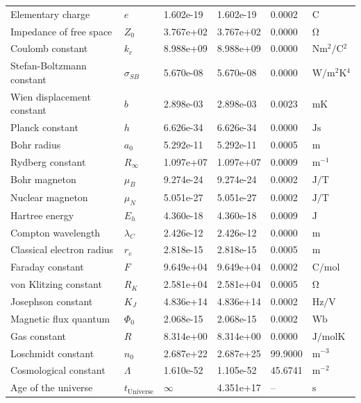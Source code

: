 \begin{longtable}{>{\raggedright}p{4.0cm}p{1.2cm}p{1.8cm}p{2.0cm}p{1.6cm}p{2.0cm}}
		Elementary charge & $e$ & 1.602e-19 & 1.602e-19 & 0.0002 & $\si{\coulomb}$ \\
		Impedance of free space & $Z_0$ & 3.767e+02 & 3.767e+02 & 0.0000 & $\si{\ohm}$ \\
		Coulomb constant & $k_e$ & 8.988e+09 & 8.988e+09 & 0.0000 & $\si{\newton \meter^2 \per \coulomb^2}$ \\
		Stefan-Boltzmann constant & $\sigma_{SB}$ & 5.670e-08 & 5.670e-08 & 0.0000 & $\si{\watt \per \meter^2 \kelvin^4}$ \\
		Wien displacement constant & $b$ & 2.898e-03 & 2.898e-03 & 0.0023 & $\si{\meter \kelvin}$ \\
		Planck constant & $h$ & 6.626e-34 & 6.626e-34 & 0.0000 & $\si{\joule \second}$ \\
		Bohr radius & $a_0$ & 5.292e-11 & 5.292e-11 & 0.0005 & $\si{\meter}$ \\
		Rydberg constant & $R_\infty$ & 1.097e+07 & 1.097e+07 & 0.0009 & $\si{\meter^{-1}}$ \\
		Bohr magneton & $\mu_B$ & 9.274e-24 & 9.274e-24 & 0.0002 & $\si{\joule \per \tesla}$ \\
		Nuclear magneton & $\mu_N$ & 5.051e-27 & 5.051e-27 & 0.0002 & $\si{\joule \per \tesla}$ \\
		Hartree energy & $E_h$ & 4.360e-18 & 4.360e-18 & 0.0009 & $\si{\joule}$ \\
		Compton wavelength & $\lambda_C$ & 2.426e-12 & 2.426e-12 & 0.0000 & $\si{\meter}$ \\
		Classical electron radius & $r_e$ & 2.818e-15 & 2.818e-15 & 0.0005 & $\si{\meter}$ \\
		Faraday constant & $F$ & 9.649e+04 & 9.649e+04 & 0.0002 & $\si{\coulomb \per \mole}$ \\
		von Klitzing constant & $R_K$ & 2.581e+04 & 2.581e+04 & 0.0005 & $\si{\ohm}$ \\
		Josephson constant & $K_J$ & 4.836e+14 & 4.836e+14 & 0.0002 & $\si{\hertz \per \volt}$ \\
		Magnetic flux quantum & $\Phi_0$ & 2.068e-15 & 2.068e-15 & 0.0002 & $\si{\weber}$ \\
		Gas constant & $R$ & 8.314e+00 & 8.314e+00 & 0.0000 & $\si{\joule \per \mole \kelvin}$ \\
		Loschmidt constant & $n_0$ & 2.687e+22 & 2.687e+25 & 99.9000 & $\si{\meter^{-3}}$ \\
		Cosmological constant & $\Lambda$ & 1.610e-52 & 1.105e-52 & 45.6741 & $\si{\meter^{-2}}$ \\
		Age of the universe & $t_{\text{Universe}}$ & $\infty$ & 4.351e+17 & -- & $\si{\second}$ \\

\end{longtable}
